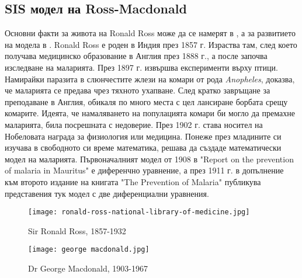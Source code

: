 

\subsection{SIS модел на Ross-Macdonald}

Основни факти за живота на Ronald Ross може да се намерят в \cite[глава~12]{Bacaer2011}, а за развитието на модела в \cite{Smith2012}.
Ronald Ross е роден в Индия през 1857 г.
Израства там, след което получава медицинско образование в Англия през 1888 г., а после започва изследване на маларията.
През 1897 г. извършва експерименти върху птици.
Намирайки паразита в слюнчестите жлези на комари от рода \textit{Anopheles}, доказва, че маларията се предава чрез тяхното ухапване.
След кратко завръщане за преподаване в Англия, обикаля по много места с цел лансиране борбата срещу комарите. Идеята, че намаляването на популацията комари би могло да премахне маларията, била посрешната с недоверие.
През 1902 г. става носител на Нобеловата награда за физиология или медицина.
Понеже през младините си изучава в свободното си време математика, решава да създаде математически модел на маларията.
Първоначалният модел от 1908 в "Report on the prevention of malaria in Mauritus" е диференчно уравнение, а през 1911 г. в допълнение към второто издание на книгата "The Prevention of Malaria" публикува представения тук модел с две диференциални уравнения.



\begin{figure}[ht]
  \centering
  \begin{minipage}{.5\textwidth}
    \centering
    \texttt{[image: ronald-ross-national-library-of-medicine.jpg]}
    \caption{Sir Ronald Ross, 1857-1932}
    \label{fig:Ross}
    \end{minipage}%
    \begin{minipage}{.5\textwidth}
    \centering
    \texttt{[image: george macdonald.jpg]}
    \caption{Dr George Macdonald, 1903-1967}
    \label{fig:Macdonald}
  \end{minipage}
\end{figure}

